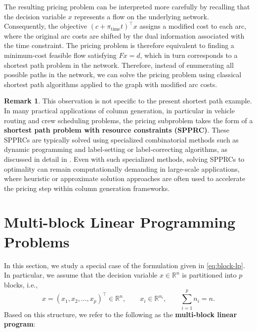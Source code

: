 \documentclass{book}
\theoremstyle{definition}
\newtheorem{remark}[theorem]{Remark}
\newcounter{algorithm_}
\numberwithin{algorithm_}{chapter}
\begin{document}
\bigskip

The resulting pricing problem can be interpreted more carefully by recalling that the decision variable $x$ represents a flow on the underlying network. Consequently, the objective $(c + \pi_{\text{time}} t)^\top x$ assigns a modified cost to each arc, where the original arc costs are shifted by the dual information associated with the time constraint. The pricing problem is therefore equivalent to finding a minimum-cost feasible flow satisfying $F x = d$, which in turn corresponds to a shortest path problem in the network. Therefore, instead of enumerating all possible paths in the network, we can solve the pricing problem using classical shortest path algorithms applied to the graph with modified arc costs.

\bigskip

\begin{remark}

This observation is not specific to the present shortest path example. In many practical applications of column generation, in particular in vehicle routing and crew scheduling problems, the pricing subproblem takes the form of a \textbf{shortest path problem with resource constraints (SPPRC)}. These SPPRCs are typically solved using specialized combinatorial methods such as dynamic programming and label-setting or label-correcting algorithms, as discussed in detail in \cite{Irnich2005}. Even with such specialized methods, solving SPPRCs to optimality can remain computationally demanding in large-scale applications, where heuristic or approximate solution approaches are often used to accelerate the pricing step within column generation frameworks.

\end{remark}


\newpage


\section{Multi-block Linear Programming Problems}
\label{sec:multiblock_structures}

In this section, we study a special case of the formulation given in \eqref{eq:block-lp}. In particular, we assume that the decision variable $x \in \mathbb{R}^n$ is partitioned into $p$ blocks, i.e.,
\[
x = (x_1, x_2, \dots, x_p)^\top \in \mathbb{R}^n, 
\qquad x_i \in \mathbb{R}^{n_i}, 
\qquad \sum_{i=1}^p n_i = n.
\]
Based on this structure, we refer to the following as the \textbf{multi-block linear program}:
\end{document}
